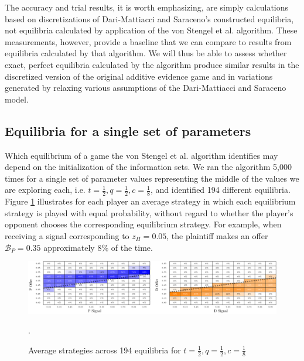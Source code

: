 \documentclass{article}
\begin{document}
The accuracy and trial results, it is worth emphasizing, are simply calculations based on discretizations of Dari-Mattiacci and Saraceno's constructed equilibria, not equilibria calculated by application of the von Stengel et al. algorithm. These measurements, however, provide a baseline that we can compare to results from equilibria calculated by that algorithm. We will thus be able to assess whether exact, perfect equilibria calculated by the algorithm produce similar results in the discretized version of the original additive evidence game and in variations generated by relaxing various assumptions of the Dari-Mattiacci and Saraceno model. 

\subsection{Equilibria for a single set of parameters}

Which equilibrium of a game the von Stengel et al. algorithm identifies may depend on the initialization of the information sets. We ran the algorithm 5,000 times for a single set of parameter values representing the middle of the values we are exploring each, i.e. $t=\frac{1}{2}, q=\frac{1}{2}, c=\frac{1}{8}$, and identified 194 different equilibria. Figure \ref{fig:multeq} illustrates for each player an average strategy in which each equilibrium strategy is played with equal probability, without regard to whether the player's opponent chooses the corresponding equilibrium strategy. For example, when receiving a signal corresponding to $z_\Pi = 0.05$, the plaintiff makes an offer $\mathcal{B}_P = 0.35$ approximately 8\% of the time. 

\begin{figure}[h!]
\centering
\includegraphics[scale=0.50, trim={0in 0in 0in 0in}, clip]{../Figures/average strategies.pdf}
\caption{Average strategies across 194 equilibria for $t = \frac{1}{2}, q = \frac{1}{2}, c = \frac{1}{8}$}. 
\label{fig:multeq}
\end{figure}
\end{document}
